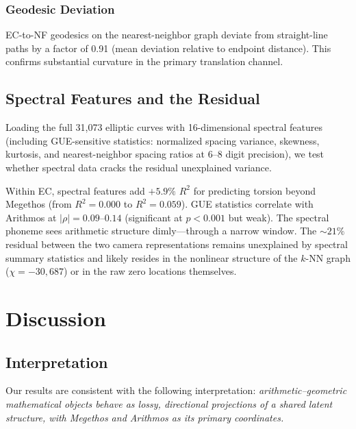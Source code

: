 \documentclass[11pt,a4paper]{article}
\begin{document}
\subsubsection{Geodesic Deviation}

EC-to-NF geodesics on the nearest-neighbor graph deviate from straight-line paths by a factor of 0.91 (mean deviation relative to endpoint distance). This confirms substantial curvature in the primary translation channel.

\subsection{Spectral Features and the Residual}

Loading the full 31,073 elliptic curves with 16-dimensional spectral features (including GUE-sensitive statistics: normalized spacing variance, skewness, kurtosis, and nearest-neighbor spacing ratios at 6--8 digit precision), we test whether spectral data cracks the residual unexplained variance.

Within EC, spectral features add $+5.9\%$ $R^2$ for predicting torsion beyond Megethos (from $R^2 = 0.000$ to $R^2 = 0.059$). GUE statistics correlate with Arithmos at $|\rho| = 0.09$--$0.14$ (significant at $p < 0.001$ but weak). The spectral phoneme sees arithmetic structure dimly---through a narrow window. The ${\sim}21\%$ residual between the two camera representations remains unexplained by spectral summary statistics and likely resides in the nonlinear structure of the $k$-NN graph ($\chi = -30{,}687$) or in the raw zero locations themselves.

\section{Discussion}

\subsection{Interpretation}

Our results are consistent with the following interpretation: \emph{arithmetic--geometric mathematical objects behave as lossy, directional projections of a shared latent structure, with Megethos and Arithmos as its primary coordinates.}
\end{document}
